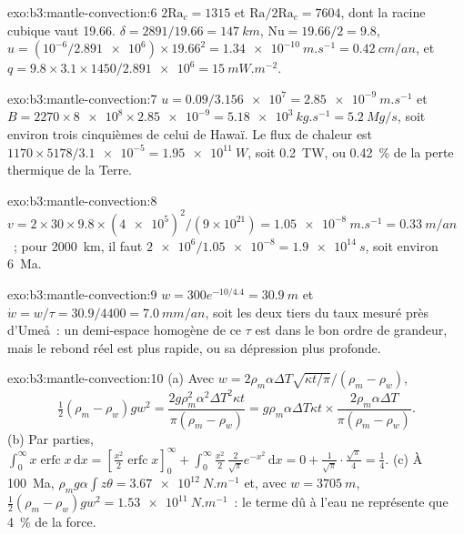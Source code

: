 \begin{solution}{exo:b3:mantle-convection:6}
$2\mathrm{Ra}_c = 1315$ et $\mathrm{Ra}/2\mathrm{Ra}_c = 7604$, dont la racine
cubique vaut 19.66. $\delta = 2891/19.66 = \qty{147}{km}$, $\mathrm{Nu} = 19.66/2 =
9.8$, $u = (10^{-6}/\num{2.891e6})\times19.66^2 = \qty{1.34e-10}{m.s^{-1}} =
\qty{0.42}{cm/an}$, et $q = 9.8\times3.1\times1450/\num{2.891e6} =
\qty{15}{mW.m^{-2}}$.
\end{solution}

\begin{solution}{exo:b3:mantle-convection:7}
$u = 0.09/\num{3.156e7} = \qty{2.85e-9}{m.s^{-1}}$ et $B = 2270\times\num{8e8}
\times\num{2.85e-9} = \qty{5.18e3}{kg.s^{-1}} = \qty{5.2}{Mg/s}$, soit environ
trois cinquièmes de celui de Hawaï. Le flux de chaleur est $1170\times5178/\num{3.1e-5} =
\qty{1.95e11}{W}$, soit \qty{0.2}{TW}, ou \qty{0.42}{\percent} de la
perte thermique de la Terre.
\end{solution}

\begin{solution}{exo:b3:mantle-convection:8}
$v = 2\times30\times9.8\times(\num{4e5})^2/(9\times10^{21}) =
\qty{1.05e-8}{m.s^{-1}} = \qty{0.33}{m/an}$~; pour \qty{2000}{km}, il faut
$\num{2e6}/\num{1.05e-8} = \qty{1.9e14}{s}$, soit environ \qty{6}{Ma}.
\end{solution}

\begin{solution}{exo:b3:mantle-convection:9}
$w = 300e^{-10/4.4} = \qty{30.9}{m}$ et $\dot w = w/\tau = 30.9/4400 =
\qty{7.0}{mm/an}$, soit les deux tiers du taux mesuré près d'Umeå~: un
demi-espace homogène de ce $\tau$ est dans le bon ordre de grandeur, mais le rebond réel est
plus rapide, ou sa dépression plus profonde.
\end{solution}

\begin{solution}{exo:b3:mantle-convection:10}
(a) Avec $w = 2\rho_m\alpha\Delta T\sqrt{\kappa t/\pi}/(\rho_m - \rho_w)$,
\[
  \tfrac12(\rho_m - \rho_w)gw^2 = \frac{2g\rho_m^2\alpha^2\Delta T^2\kappa t}
  {\pi(\rho_m - \rho_w)} = g\rho_m\alpha\Delta T\kappa t\times
  \frac{2\rho_m\alpha\Delta T}{\pi(\rho_m - \rho_w)} .
\] (b) Par parties,
$\int_0^\infty x\operatorname{erfc}x\,\mathrm dx = [\tfrac{x^2}2\operatorname{erfc}
x]_0^\infty + \int_0^\infty\tfrac{x^2}2\,\tfrac2{\sqrt\pi}e^{-x^2}\,\mathrm dx =
0 + \tfrac1{\sqrt\pi}\cdot\tfrac{\sqrt\pi}4 = \tfrac14$. (c) À \qty{100}{Ma},
$\rho_mg\alpha\int z\theta = \qty{3.67e12}{N.m^{-1}}$ et, avec $w =
\qty{3705}{m}$, $\tfrac12(\rho_m - \rho_w)gw^2 = \qty{1.53e11}{N.m^{-1}}$~: le
terme dû à l'eau ne représente que \qty{4}{\percent} de la force.
\end{solution}

